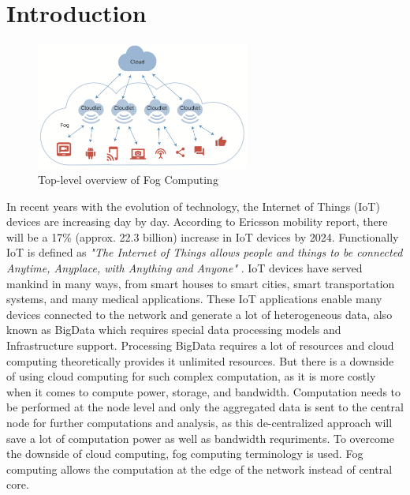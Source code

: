   \section{Introduction}
  \label{sec:introduction}
  \begin{figure}
    \centering
    \includegraphics[width=70mm]{figures/mlcn-fog-1.pdf}
    \caption{Top-level overview of Fog Computing\cite{Bittencourt2017}}
    \label{fig:fog-arch}
  \end{figure}
  In recent years with the evolution of technology, the Internet of Things (IoT) devices are increasing day by day. According to Ericsson mobility report\cite{erricssonreport}, there will be a 17\% (approx. 22.3 billion) increase in IoT devices by 2024. Functionally IoT is defined as \emph{"The Internet of Things allows people and things to be connected Anytime, Anyplace, with Anything and Anyone"} \cite{euiotdef}. IoT devices have served mankind in many ways, from smart houses to smart cities, smart transportation systems, and many medical applications. These IoT applications enable many devices connected to the network and generate a lot of heterogeneous data, also known as BigData which requires special data processing models and Infrastructure support\cite{Bittencourt2017}. Processing BigData requires a lot of resources and cloud computing theoretically provides it unlimited resources\cite{10.1145/3057266}. But there is a downside of using cloud computing for such complex computation, as it is more costly when it comes to compute power, storage, and bandwidth\cite{10.1145/3057266}. Computation needs to be performed at the node level and only the aggregated data is sent to the central node for further computations and analysis, as this de-centralized approach will save a lot of computation power as well as bandwidth requriments\cite{10.1145/3057266}. To overcome the downside of cloud computing, fog computing terminology is used. Fog computing allows the computation at the edge of the network instead of central core\cite{10.1145/3057266}. \par
